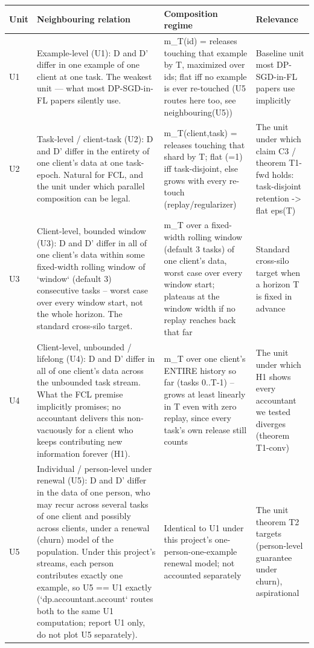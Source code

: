 \begin{tabular}{lp{5cm}p{4cm}p{4cm}}
\toprule
Unit & Neighbouring relation & Composition regime & Relevance \\
\midrule
U1 & Example-level (U1): D and D' differ in one example of one client at one task. The weakest unit — what most DP-SGD-in-FL papers silently use. & m\_T(id) = releases touching that example by T, maximized over ids; flat iff no example is ever re-touched (U5 routes here too, see neighbouring(U5)) & Baseline unit most DP-SGD-in-FL papers use implicitly \\
U2 & Task-level / client-task (U2): D and D' differ in the entirety of one client's data at one task-epoch. Natural for FCL, and the unit under which parallel composition can be legal. & m\_T(client,task) = releases touching that shard by T; flat (=1) iff task-disjoint, else grows with every re-touch (replay/regularizer) & The unit under which claim C3 / theorem T1-fwd holds: task-disjoint retention -> flat eps(T) \\
U3 & Client-level, bounded window (U3): D and D' differ in all of one client's data within some fixed-width rolling window of `window` (default 3) consecutive tasks -- worst case over every window start, not the whole horizon. The standard cross-silo target. & m\_T over a fixed-width rolling window (default 3 tasks) of one client's data, worst case over every window start; plateaus at the window width if no replay reaches back that far & Standard cross-silo target when a horizon T is fixed in advance \\
U4 & Client-level, unbounded / lifelong (U4): D and D' differ in all of one client's data across the unbounded task stream. What the FCL premise implicitly promises; no accountant delivers this non-vacuously for a client who keeps contributing new information forever (H1). & m\_T over one client's ENTIRE history so far (tasks 0..T-1) -- grows at least linearly in T even with zero replay, since every task's own release still counts & The unit under which H1 shows every accountant we tested diverges (theorem T1-conv) \\
U5 & Individual / person-level under renewal (U5): D and D' differ in the data of one person, who may recur across several tasks of one client and possibly across clients, under a renewal (churn) model of the population. Under this project's streams, each person contributes exactly one example, so U5 == U1 exactly (`dp.accountant.account` routes both to the same U1 computation; report U1 only, do not plot U5 separately). & Identical to U1 under this project's one-person-one-example renewal model; not accounted separately & The unit theorem T2 targets (person-level guarantee under churn), aspirational \\
\bottomrule
\end{tabular}
